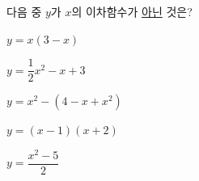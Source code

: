 다음 중 $y$가 $x$의 이차함수가 \underline{아닌} 것은?
\begin{choicesii}{\rule[-3ex]{0pt}{8ex}$y=x(3-x)$}{\rule[-3ex]{0pt}{8ex}$y=\dfrac{1}{2}x^2-x+3$}{\rule[-3ex]{0pt}{8ex}$y=x^2-(4-x+x^2)$}{\rule[-3ex]{0pt}{8ex}$y=(x-1)(x+2)$}{\rule[-3ex]{0pt}{8ex}$y=\dfrac{x^2-5}{2}$}\end{choicesii}
